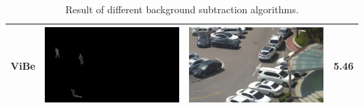 \documentclass[11pt]{hyu_thesis}
\begin{document}
\begin{table}
\begin{tabular}{cccc}
		ViBe & \parbox[c]{0.35\linewidth}{\includegraphics[width=\linewidth]{bgm-fg-ViBe.png}} & \parbox[c]{0.35\linewidth}{\includegraphics[width=\linewidth]{bgm-bg-ViBe.png}} & 5.46 \\
		\hline
	\end{tabular}
	\caption{Result of different background subtraction algorithms.}
	\label{tb:bgm}
\end{table}
\end{document}
